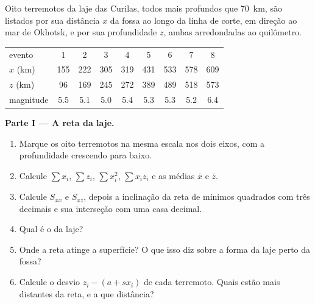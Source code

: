 \begin{problem}
\label{pb:b1:active-margins:1}
Oito terremotos da laje das Curilas, todos mais profundos que \qty{70}{km}, são listados por sua distância $x$ da fossa ao longo da linha de corte, em direção ao mar de Okhotsk, e por sua profundidade $z$, ambas arredondadas ao quilômetro.

\begin{center}
\small
\begin{tabular}{lcccccccc}
\hline
evento & 1 & 2 & 3 & 4 & 5 & 6 & 7 & 8\\
$x$ (\unit{km}) & 155 & 222 & 305 & 319 & 431 & 533 & 578 & 609\\
$z$ (\unit{km}) & 96 & 169 & 245 & 272 & 389 & 489 & 518 & 573\\
magnitude & 5.5 & 5.1 & 5.0 & 5.4 & 5.3 & 5.3 & 5.2 & 6.4\\
\hline
\end{tabular}
\end{center}

\medskip
\noindent\textbf{Parte I --- A reta da laje.}
\begin{enumerate}
  \item Marque os oito terremotos na mesma escala nos dois eixos, com a profundidade crescendo para baixo.
  \item Calcule $\sum x_i$, $\sum z_i$, $\sum x_i^2$, $\sum x_i z_i$ e as médias $\bar x$ e $\bar z$.
  \item Calcule $S_{xx}$ e $S_{xz}$, depois a inclinação da reta de mínimos quadrados com três decimais e sua interseção com uma casa decimal.
  \item Qual é o  da laje?
  \item Onde a reta atinge a superfície? O que isso diz sobre a forma da laje perto da fossa?
  \item Calcule o desvio $z_i - (a + s x_i)$ de cada terremoto. Quais estão mais distantes da reta, e a que distância?
\end{enumerate}


\end{problem}
